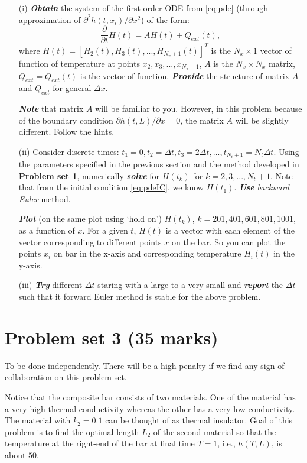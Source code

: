 \documentclass[11pt,a4paper]{article}
\newcommand{\p}{\partial }
\newcommand{\bfit}[1]{\textit{\textbf{#1}}}
\begin{document}
\begin{itemize}
\item[(i)] \bfit{Obtain} the system of the first order ODE from \eqref{eq:pde} (through approximation of $\p^2 h(t, x_i)/ \p x^2$) of the form:
\begin{equation}\label{eq:pdeDisc}
\frac{\p}{\p t} H(t) = A H(t) + Q_{ext} (t),
\end{equation}
where $H(t) = [H_2(t), H_3(t), ..., H_{N_x + 1}(t)]^T$ is the $N_x \times 1$ vector of function of temperature at points $x_2, x_3, ..., x_{N_x + 1}$, $A$ is the $N_x \times N_x$ matrix, $Q_{ext} = Q_{ext}(t)$ is the vector of function. \bfit{Provide} the structure of matrix $A$ and $Q_{ext}$ for general $\Delta x$. 

\bfit{Note} that matrix $A$ will be familiar to you. However, in this problem because of the boundary condition $\p h(t, L) / \p x = 0$, the matrix $A$ will be slightly different. Follow the hints.  

\item[(ii)] Consider discrete times: $t_1 = 0, t_2 = \Delta t, t_3 = 2\Delta t, ..., t_{N_t + 1} = N_t \Delta t$. Using the parameters specified in the previous section and the method developed in {\bf Problem set 1}, numerically \bfit{solve} for $H(t_k)$ for $k=2, 3, ..., N_t + 1$. Note that from the initial condition \eqref{eq:pdeIC}, we know $H(t_1)$. \bfit{Use} {\it backward Euler} method. 

\bfit{Plot} (on the same plot using `hold on') $H(t_k)$, $k=201, 401, 601, 801, 1001$, as a function of $x$. For a given $t$, $H(t)$ is a vector with each element of the vector corresponding to different points $x$ on the bar. So you can plot the points $x_i$ on bar in the x-axis and corresponding temperature $H_i(t)$ in the y-axis.

\item[(iii)] \bfit{Try} different $\Delta t$ staring with a large to a very small and \bfit{report} the $\Delta t$ such that {it forward Euler} method is stable for the above problem.
\end{itemize}
 
\section{Problem set 3 (35 marks)}
{\color{red} To be done independently. There will be a high penalty if we find any sign of collaboration on this problem set.}

\noindent Notice that the composite bar consists of two materials. One of the material has a very high thermal conductivity whereas the other has a very low conductivity. The material with $k_2 = 0.1$ can be thought of as thermal insulator. Goal of this problem is to find the optimal length $L_2$ of the second material so that the temperature at the right-end of the bar at final time $T = 1$, i.e., $h(T, L)$, is about $50$. 
\end{document}
